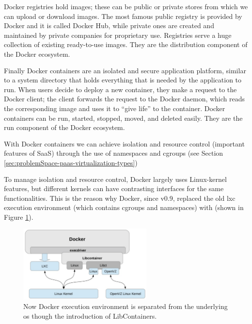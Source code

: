 Docker registries hold images; these can be public or private stores from which we can upload or
download images. The most famous public registry is provided by Docker and it is called Docker Hub, while
private ones are created and maintained by private companies for proprietary use. Registries serve a
huge collection of existing ready-to-use images. They are the distribution component of the Docker
ecosystem.

Finally Docker containers are an isolated and secure application platform, similar to a system directory
that holds everything that is needed by the application to run. When users decide to deploy a new
container, they make a request to the Docker client; the client forwards the request to the Docker
daemon, which reads the corresponding image and uses it to “give life” to the container. Docker containers
can be run, started, stopped, moved, and deleted easily. They are the run component of the Docker ecosystem.

With Docker containers we can achieve isolation and resource control (important features of SaaS)
through the use of namespaces and cgroups (see Section \ref{sec:problemSpace-paas-virtualization-types})

To manage isolation and resource control, Docker largely uses Linux-kernel features, but different kernels
can have contrasting interfaces for the same functionalities. This is the reason why Docker, since v0.9,
replaced the old \ac{lxc} execution environment (which contains cgroups and namespaces) with
 (shown in Figure \ref{img:problemSpace-docker-architecture-libcontainer}).

\begin{figure}
	\centering{}
	\includegraphics[width=0.6\textwidth]{chapters/problem/images/libcontainer.png}
	\caption[Docker libcontainer overview]{Now Docker execution environment is separated from the underlying
		\acs{os} though the introduction of LibContainers.}
	\label{img:problemSpace-docker-architecture-libcontainer}
\end{figure}

